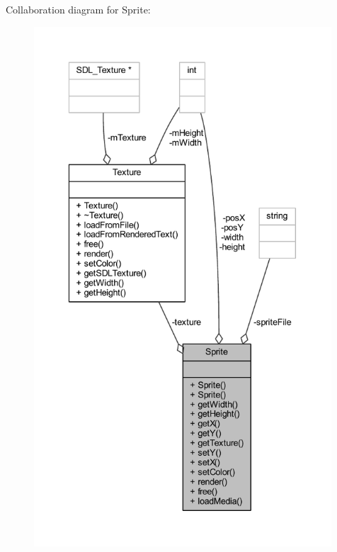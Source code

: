 Collaboration diagram for Sprite\+:\nopagebreak
\begin{figure}[H]
\begin{center}
\leavevmode
\includegraphics[height=550pt]{class_sprite__coll__graph}
\end{center}
\end{figure}
